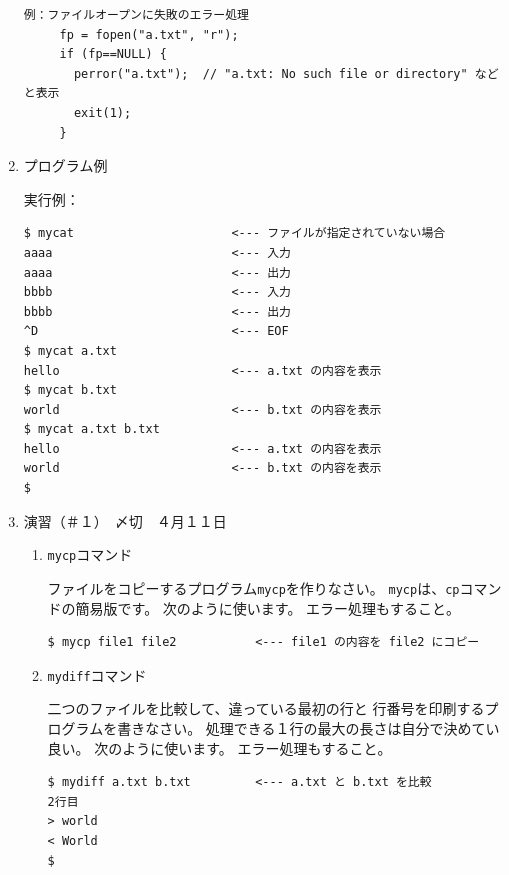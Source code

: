 \documentclass[a4j,dvipdfmx]{jarticle}
\begin{document}
\begin{enumerate}
\begin{lstlisting}[numbers=none]
例：ファイルオープンに失敗のエラー処理
     fp = fopen("a.txt", "r");
     if (fp==NULL) {
       perror("a.txt");  // "a.txt: No such file or directory" などと表示
       exit(1);
     }
\end{lstlisting}

\item プログラム例



実行例：

\begin{lstlisting}[numbers=none]
$ mycat                      <--- ファイルが指定されていない場合
aaaa                         <--- 入力
aaaa                         <--- 出力
bbbb                         <--- 入力
bbbb                         <--- 出力
^D                           <--- EOF
$ mycat a.txt
hello                        <--- a.txt の内容を表示
$ mycat b.txt
world                        <--- b.txt の内容を表示
$ mycat a.txt b.txt
hello                        <--- a.txt の内容を表示
world                        <--- b.txt の内容を表示
$
\end{lstlisting}

\item 演習（＃１）　〆切　４月１１日
\begin{enumerate}
\item {\tt mycp}コマンド

ファイルをコピーするプログラム{\tt mycp}を作りなさい。
{\tt mycp}は、{\tt cp}コマンドの簡易版です。
次のように使います。
エラー処理もすること。
\begin{lstlisting}[numbers=none]
$ mycp file1 file2           <--- file1 の内容を file2 にコピー
\end{lstlisting}

\item {\tt mydiff}コマンド

二つのファイルを比較して、違っている最初の行と
行番号を印刷するプログラムを書きなさい。
処理できる１行の最大の長さは自分で決めてい良い。
次のように使います。
エラー処理もすること。
\begin{lstlisting}[numbers=none]
$ mydiff a.txt b.txt         <--- a.txt と b.txt を比較
2行目
> world
< World
$
\end{lstlisting}
\end{enumerate}

\end{enumerate}
\end{document}
